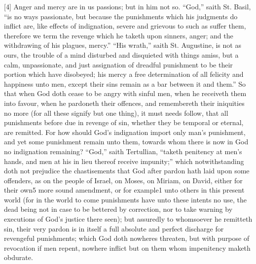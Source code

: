 [4] Anger and mercy are in us passions; but in him not so. “God,” saith St. Basil, “is no ways passionate, but because the punishments which his judgments do inflict are, like effects of indignation, severe and grievous to such as suffer them, therefore we term the revenge which he taketh upon sinners, anger; and the withdrawing of his plagues, mercy.” “His wrath,” saith St. Augustine, is not as ours, the trouble of a mind disturbed and disquieted with things amiss, but a calm, unpassionate, and just assignation of dreadful punishment to be their portion which have disobeyed; his mercy a free determination of all felicity and happiness unto men, except their sins remain as a bar between it and them.” So that when God doth cease to be angry with sinful men, when he receiveth them into favour, when he pardoneth their offences, and remembereth their iniquities no more (for all these signify but one thing), it must needs follow, that all punishments before due in revenge of sin, whether they be temporal or eternal, are remitted. For how should God’s indignation import only man’s punishment, and yet some punishment remain unto them, towards whom there is now in God no indignation remaining? “God,” saith Tertullian, “taketh penitency at men’s hands, and men at his in lieu thereof receive impunity;” which notwithstanding doth not prejudice the chastisements that God after pardon hath laid upon some offenders, as on the people of Israel, on Moses, on Miriam, on David, either for their own5 more sound amendment, or  for example1 unto others in this present world (for in the world to come punishments have unto these intents no use, the dead being not in case to be bettered by correction, nor to take warning by executions of God’s justice there seen); but assuredly to whomsoever he remitteth sin, their very pardon is in itself a full absolute and perfect discharge for revengeful punishments; which God doth nowheres threaten, but with purpose of revocation if men repent, nowhere inflict but on them whom impenitency maketh obdurate.

